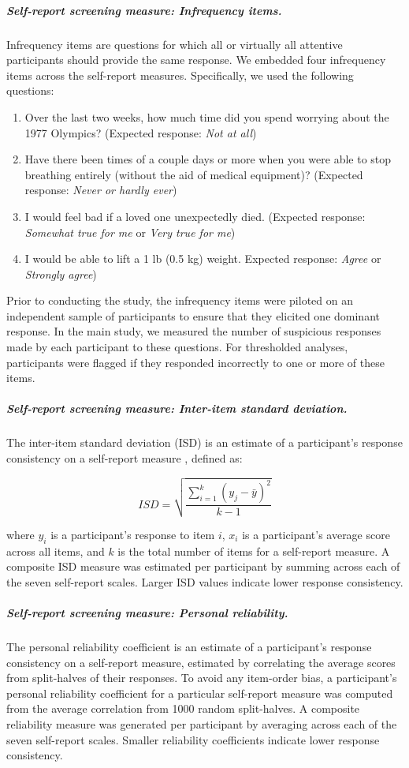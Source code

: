 \documentclass[a4paper,notitlepage,12pt]{article}
\begin{document}
\subparagraph{Self-report screening measure: Infrequency items.} Infrequency items are questions for which all or virtually all attentive participants should provide the same response. We embedded four infrequency items across the self-report measures. Specifically, we used the following questions:

\begin{enumerate}
  \item Over the last two weeks, how much time did you spend worrying about the 1977 Olympics? (Expected response: \textit{Not at all})
  \item Have there been times of a couple days or more when you were able to stop breathing entirely (without the aid of medical equipment)? (Expected response: \textit{Never or hardly ever})
  \item I would feel bad if a loved one unexpectedly died. (Expected response: \textit{Somewhat true for me} or \textit{Very true for me})
  \item I would be able to lift a 1 lb (0.5 kg) weight. Expected response: \textit{Agree} or \textit{Strongly agree})
\end{enumerate}

Prior to conducting the study, the infrequency items were piloted on an independent sample of participants to ensure that they elicited one dominant response. In the main study, we measured the number of suspicious responses made by each participant to these questions. For thresholded analyses, participants were flagged if they responded incorrectly to one or more of these items.

\subparagraph{Self-report screening measure: Inter-item standard deviation.} The inter-item standard deviation (ISD) is an estimate of a participant's response consistency on a self-report measure \cite{marjanovic2015inter}, defined as:

\begin{equation*}
    ISD = \sqrt{\frac{\sum^k_{i=1}(y_j - \bar{y})^2}{k-1}}
\end{equation*}

where $y_i$ is a participant's response to item $i$, $x_i$ is a participant's average score across all  items, and $k$ is the total number of items for a self-report measure. A composite ISD measure was estimated per participant by summing across each of the seven self-report scales. Larger ISD values indicate lower response consistency.

\subparagraph{Self-report screening measure: Personal reliability.} The personal reliability coefficient is an estimate of a participant's response consistency on a self-report measure, estimated by correlating the average scores from split-halves of their responses. To avoid any item-order bias, a participant's personal reliability coefficient for a particular self-report measure was computed from the average correlation from 1000 random split-halves. A composite reliability measure was generated per participant by averaging across each of the seven self-report scales. Smaller reliability coefficients indicate lower response consistency.  
\end{document}
